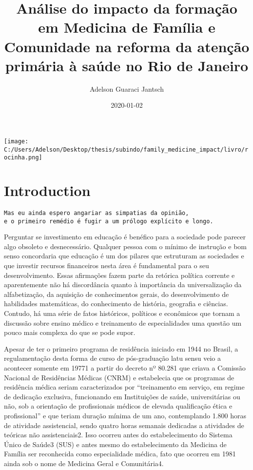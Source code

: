 \documentclass[]{book}
\title{Análise do impacto da formação em Medicina de Família e Comunidade na reforma da atenção primária à saúde no Rio de Janeiro}
\author{Adelson Guaraci Jantsch}
\date{2020-01-02}
\begin{document}
\maketitle

{
\setcounter{tocdepth}{1}
\tableofcontents
}
\hypertarget{section}{%
\chapter*{}\label{section}}

\texttt{[image: C:/Users/Adelson/Desktop/thesis/subindo/family\_medicine\_impact/livro/rocinha.png]}

\hypertarget{introduction}{%
\chapter*{Introduction}\label{introduction}}

\begin{verbatim}
Mas eu ainda espero angariar as simpatias da opinião, 
e o primeiro remédio é fugir a um prólogo explícito e longo.
\end{verbatim}

Perguntar se investimento em educação é benéfico para a sociedade pode parecer algo obsoleto e desnecessário. Qualquer pessoa com o mínimo de instrução e bom senso concordaria que educação é um dos pilares que estruturam as sociedades e que investir recursos financeiros nesta área é fundamental para o seu desenvolvimento. Essas afirmações fazem parte da retórica política corrente e aparentemente não há discordância quanto à importância da universalização da alfabetização, da aquisição de conhecimentos gerais, do desenvolvimento de habilidades matemáticas, do conhecimento de história, geografia e ciências. Contudo, há uma série de fatos históricos, políticos e econômicos que tornam a discussão sobre ensino médico e treinamento de especialidades uma questão um pouco mais complexa do que se pode supor.

Apesar de ter o primeiro programa de residência iniciado em 1944 no Brasil, a regulamentação desta forma de curso de pós-graduação latu sensu veio a acontecer somente em 19771 a partir do decreto nº 80.281 que criava a Comissão Nacional de Residências Médicas (CNRM) e estabelecia que os programas de residência médica seriam caracterizados por ``treinamento em serviço, em regime de dedicação exclusiva, funcionando em Instituições de saúde, universitárias ou não, sob a orientação de profissionais médicos de elevada qualificação ética e profissional'' e que teriam duração mínima de um ano, contemplando 1.800 horas de atividade assistencial, sendo quatro horas semanais dedicadas a atividades de teóricas não assistenciais2. Isso ocorreu antes do estabelecimento do Sistema Único de Saúde3 (SUS) e antes mesmo do estabelecimento da Medicina de Família ser reconhecida como especialidade médica, fato que ocorreu em 1981 ainda sob o nome de Medicina Geral e Comunitária4.
\end{document}
